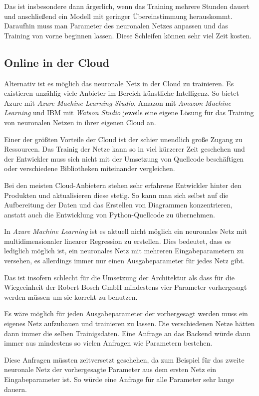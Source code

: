 Das ist insbesondere dann ärgerlich, wenn das Training mehrere Stunden dauert und anschließend ein Modell mit geringer
Übereinstimmung herauskommt. Daraufhin muss man Parameter des neuronalen Netzes anpassen und das Training von vorne
beginnen lassen. Diese Schleifen können sehr viel Zeit kosten.

\subsection{Online in der Cloud}
Alternativ ist es möglich das neuronale Netz in der Cloud zu trainieren. Es existieren unzählig viele Anbieter im
Bereich künstliche Intelligenz. So bietet Azure mit \textit{Azure Machine Learning Studio}, Amazon mit
\textit{Amazon Machine Learning} und IBM mit \textit{Watson Studio} jeweils eine eigene Lösung für das Training von
neuronalen Netzen in ihrer eigenen Cloud an.

Einer der größten Vorteile der Cloud ist der schier unendlich große Zugang zu Ressourcen. Das Trainig der Netze kann so
in viel kürzerer Zeit geschehen und der Entwickler muss sich nicht mit der Umsetzung von Quellcode beschäftigen oder
verschiedene Bibliotheken miteinander vergleichen.

Bei den meisten Cloud-Anbietern stehen sehr erfahrene Entwickler hinter den Produkten und aktualisieren diese stetig. So
kann man sich selbst auf die Aufbereitung der Daten und das Erstellen von Diagrammen konzentrieren, anstatt auch die
Entwicklung von Python-Quellcode zu übernehmen.

In \textit{Azure Machine Learning} ist es aktuell nicht möglich ein neuronales Netz mit multidimensionaler linearer
Regression zu erstellen. Dies bedeutet, dass es lediglich möglich ist, ein neuronales Netz mit mehreren
Eingabeparametern zu versehen, es allerdings immer nur einen Ausgabeparameter für jedes Netz gibt.

Das ist insofern schlecht für die Umsetzung der Architektur als dass für die Wiegeeinheit der Robert Bosch GmbH
mindestens vier Parameter vorhergesagt werden müssen um sie korrekt zu benutzen.

Es wäre möglich für jeden Ausgabeparameter der vorhergesagt werden muss ein eigenes Netz aufzubauen und trainieren zu
lassen. Die verschiedenen Netze hätten dann immer die selben Trainigsdaten. Eine Anfrage an das Backend würde dann immer
aus mindestens so vielen Anfragen wie Parametern bestehen.

Diese Anfragen müssten zeitversetzt geschehen, da zum Beispiel für das zweite neuronale Netz der vorhergesagte Parameter
aus dem ersten Netz ein Eingabeparameter ist. So würde eine Anfrage für alle Parameter sehr lange dauern.


